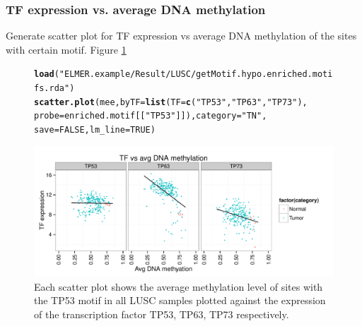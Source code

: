 \documentclass{article}\usepackage[]{graphicx}\usepackage[usenames,dvipsnames]{color}
\makeatletter
\def\maxwidth{ %
  \ifdim\Gin@nat@width>\linewidth
    \linewidth
  \else
    \Gin@nat@width
  \fi
}
\newcommand{\hlnum}[1]{\textcolor[rgb]{0.686,0.059,0.569}{#1}}%
\newcommand{\hlstr}[1]{\textcolor[rgb]{0.192,0.494,0.8}{#1}}%
\newcommand{\hlstd}[1]{\textcolor[rgb]{0.345,0.345,0.345}{#1}}%
\newcommand{\hlkwc}[1]{\textcolor[rgb]{0.333,0.667,0.333}{#1}}%
\newcommand{\hlkwd}[1]{\textcolor[rgb]{0.737,0.353,0.396}{\textbf{#1}}}%
\newenvironment{kframe}{%
 \def\at@end@of@kframe{}%
 \ifinner\ifhmode%
  \def\at@end@of@kframe{\end{minipage}}%
  \begin{minipage}{\columnwidth}%
 \fi\fi%
 \def\FrameCommand##1{\hskip\@totalleftmargin \hskip-\fboxsep
 \colorbox{shadecolor}{##1}\hskip-\fboxsep
     \hskip-\linewidth \hskip-\@totalleftmargin \hskip\columnwidth}%
 \MakeFramed {\advance\hsize-\width
   \@totalleftmargin\z@ \linewidth\hsize
   \@setminipage}}%
 {\par\unskip\endMakeFramed%
 \at@end@of@kframe}
\newenvironment{knitrout}{}{} %
\makeatother
\begin{document}
\subsubsection{TF expression vs. average DNA methylation}
Generate scatter plot for TF expression vs average DNA methylation of the sites 
with certain motif. Figure \ref{fig:figure3}
\begin{figure}[H]
\begin{knitrout}
\color{fgcolor}\begin{kframe}
\begin{alltt}
\hlkwd{load}\hlstd{(}\hlstr{"ELMER.example/Result/LUSC/getMotif.hypo.enriched.motifs.rda"}\hlstd{)}
\hlkwd{scatter.plot}\hlstd{(mee,}\hlkwc{byTF}\hlstd{=}\hlkwd{list}\hlstd{(}\hlkwc{TF}\hlstd{=}\hlkwd{c}\hlstd{(}\hlstr{"TP53"}\hlstd{,}\hlstr{"TP63"}\hlstd{,}\hlstr{"TP73"}\hlstd{),}
             \hlkwc{probe}\hlstd{=enriched.motif[[}\hlstr{"TP53"}\hlstd{]]),} \hlkwc{category}\hlstd{=}\hlstr{"TN"}\hlstd{,}
             \hlkwc{save}\hlstd{=}\hlnum{FALSE}\hlstd{,}\hlkwc{lm_line}\hlstd{=}\hlnum{TRUE}\hlstd{)}
\end{alltt}
\end{kframe}

{\centering \includegraphics[width=\maxwidth]{figure/figure3-1} 

}



\end{knitrout}
\protect\caption{Each scatter plot shows the average 
methylation level of sites with the TP53 motif in all LUSC samples plotted 
against the expression of the transcription factor TP53, TP63, TP73 respectively.
\label{fig:figure3}}
\end{figure}
\end{document}
